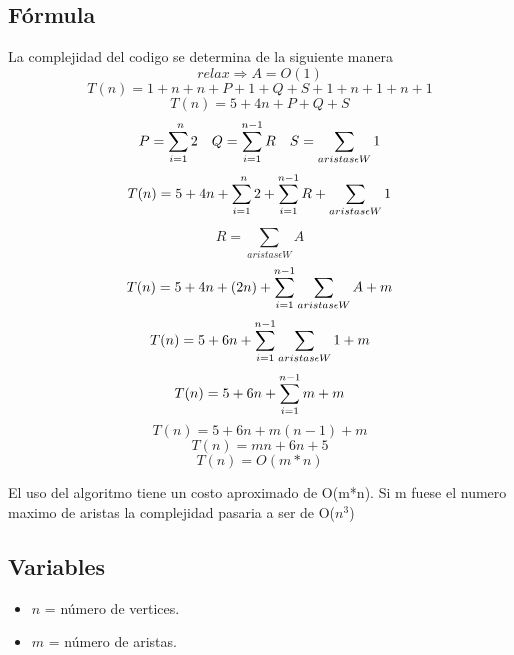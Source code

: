 \subsection*{Fórmula }
La complejidad del codigo se determina de la siguiente manera
\[relax \Longrightarrow A = O(1)\]
\[T(n) = 1 + n + n + P + 1 + Q + S + 1 + n + 1 + n + 1 \]
\[T(n) = 5 + 4n + P + Q + S \]
\[P = \sum_{i = 1}^{\\n} 2 \quad Q = \sum_{i = 1}^{\\n-1} R \quad S = \sum_{aristas \epsilon W }^{} 1 \]
\[T(n) = 5 + 4n + \sum_{i = 1}^{\\n} 2 + \sum_{i = 1}^{\\n-1} R + \sum_{aristas \epsilon W }^{} 1 \]
\[R = \sum_{aristas \epsilon W }^{} A \]
\[T(n) = 5 + 4n + (2n) + \sum_{i = 1}^{\\n-1} \sum_{aristas \epsilon W }^{} A + m\]
\[T(n) = 5 + 6n + \sum_{i = 1}^{\\n-1} \sum_{aristas \epsilon W }^{} 1 + m\]
\[T(n) = 5 + 6n + \sum_{i = 1}^{\\n-1} m + m\]
\[T(n) = 5 + 6n + m(n-1) + m\]
\[T(n) = mn + 6n + 5\]
\[T(n) = O(m*n)\]

El uso del algoritmo tiene un costo aproximado de O(m*n). Si m fuese el numero maximo de aristas la complejidad pasaria a ser de O($n^3$)

\subsection*{Variables}

\begin{itemize}
    \item \( n \) = número de vertices.
    \item \( m \) = número de aristas.
\end{itemize}

